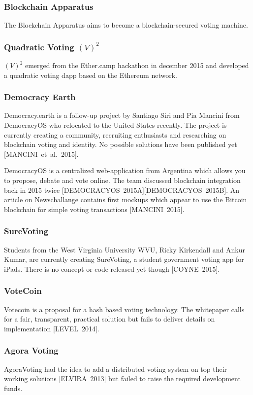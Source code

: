 \documentclass[9pt,oneside]{amsart}
\begin{document}
\begin{multicols}{2}
\subsubsection{Blockchain Apparatus}
The Blockchain Apparatus aims to become a blockchain-secured voting machine.
\subsubsection{Quadratic Voting $(V)^2$}
$(V)^2$ emerged from the Ether.camp hackathon in december 2015 and developed a quadratic voting dapp based on the Ethereum network.
\subsubsection{Democracy Earth}
Democracy.earth is a follow-up project by Santiago Siri and Pia Mancini from DemocracyOS who relocated to the United States recently. The project is currently creating a community, recruiting enthusiasts and researching on blockchain voting and identity. No possible solutions have been published yet [MANCINI~et~al.~2015].\par
DemocracyOS is a centralized web-application from Argentina which allows you to propose, debate and vote online. The team discussed blockchain integration back in 2015 twice [DEMOCRACYOS~2015A][DEMOCRACYOS~2015B]. An article on Newschallange contains first mockups which appear to use the Bitcoin blockchain for simple voting transactions [MANCINI~2015].
\subsubsection{SureVoting}
Students from the West Virginia University WVU, Ricky Kirkendall and Ankur Kumar, are currently creating SureVoting, a student government voting app for iPads. There is no concept or code released yet though [COYNE~2015].
\subsubsection{VoteCoin}
Votecoin is a proposal for a hash based voting technology. The whitepaper calls for a fair, transparent, practical solution but fails to deliver details on implementation [LEVEL~2014].
\subsubsection{Agora Voting}
AgoraVoting had the idea to add a distributed voting system on top their working solutions [ELVIRA~2013] but failed to raise the required development funds.

\end{multicols}
\end{document}
